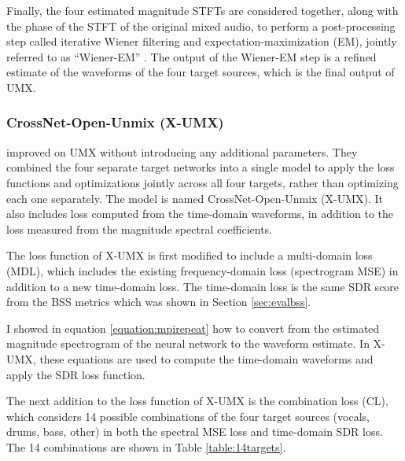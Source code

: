 \documentclass[report.tex]{subfiles}
\begin{document}
Finally, the four estimated magnitude STFTs are considered together, along with the phase of the STFT of the original mixed audio, to perform a post-processing step called iterative Wiener filtering and expectation-maximization (EM), jointly referred to as ``Wiener-EM'' \parencite{umxorig1, wiener2, wiener3, wiener4}. The output of the Wiener-EM step is a refined estimate of the waveforms of the four target sources, which is the final output of UMX.

\subsubsection{CrossNet-Open-Unmix (X-UMX)}
\label{sec:xumx}

\textcite{xumx} improved on UMX without introducing any additional parameters. They combined the four separate target networks into a single model to apply the loss functions and optimizations jointly across all four targets, rather than optimizing each one separately. The model is named CrossNet-Open-Unmix (X-UMX). It also includes loss computed from the time-domain waveforms, in addition to the loss measured from the magnitude spectral coefficients.

The loss function of X-UMX is first modified to include a multi-domain loss (MDL), which includes the existing frequency-domain loss (spectrogram MSE) in addition to a new time-domain loss. The time-domain loss is the same SDR score from the BSS metrics which was shown in Section \ref{sec:evalbss}.

I showed in equation \ref{equation:mpirepeat} how to convert from the estimated magnitude spectrogram of the neural network to the waveform estimate. In X-UMX, these equations are used to compute the time-domain waveforms and apply the SDR loss function.

The next addition to the loss function of X-UMX is the combination loss (CL), which considers 14 possible combinations of the four target sources (vocals, drums, bass, other) in both the spectral MSE loss and time-domain SDR loss. The 14 combinations are shown in Table \ref{table:14targets}.
\end{document}
